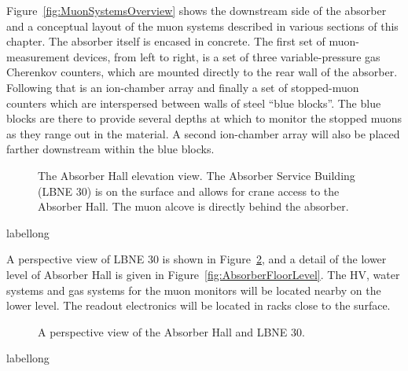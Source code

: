 Figure~\ref{fig:MuonSystemsOverview} shows the downstream side of the
absorber and a conceptual layout of the muon systems described in various sections of this
chapter.  
The absorber itself is encased in concrete. The first set of
muon-measurement devices, from left to right, is a
set of three variable-pressure gas Cherenkov counters, which are
mounted directly to the rear wall of the absorber. Following that is an ion-chamber array and finally a set of stopped-muon counters which are interspersed between walls of
steel ``blue blocks''.   The blue blocks are there to provide several
depths at which to monitor the stopped muons as they range out in the
material. A second ion-chamber array will also be placed farther downstream within the blue blocks.

\begin{figure}[htbp]
\begin{center}
\caption[The Absorber Hall elevation view]{ The Absorber Hall elevation view. The Absorber Service Building (LBNE 30) is on the surface and allows for crane access 
to the Absorber Hall. The muon alcove is directly behind the absorber. 
}
\label{fig:AbsorberHallElevation}
\end{center}
\end{figure}
\begin{cdrfigure}[short]{label}{long}
\end{cdrfigure}

A perspective view of LBNE 30 is shown in Figure~\ref{fig:AbsorberServiceBuilding}, and a detail of the lower level of Absorber Hall
is given in Figure~\ref{fig:AbsorberFloorLevel}.  The HV, water systems and gas systems for the muon monitors will be located nearby on the lower level.
The readout electronics will be located in racks close to the surface. 

\begin{figure}[htbp]
\begin{center}
\caption[The Absorber Hall with LBNE 30]{A perspective view of the Absorber Hall and LBNE 30.}
\label{fig:AbsorberServiceBuilding}
\end{center}
\end{figure}
\begin{cdrfigure}[short]{label}{long}
\end{cdrfigure}

